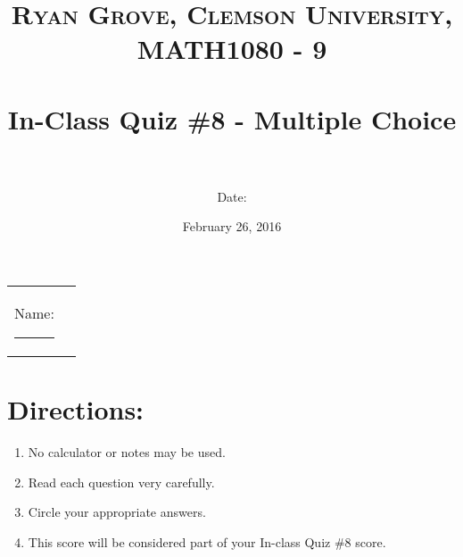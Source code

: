 \documentclass[paper=a4, fontsize=11pt]{scrartcl} %
\title{	
\normalfont \normalsize 
\textsc{Ryan Grove, Clemson University, MATH1080 - 9} \\ [25pt] %
\horrule{0.5pt} \\[0.4cm] %
\huge In-Class Quiz \#8 - Multiple Choice \\ %
\horrule{2pt} \\[0.5cm] %
}
\author{Date:} %
\date{\normalsize February 26, 2016} %
\numberwithin{equation}{section} %
\numberwithin{figure}{section} %
\numberwithin{table}{section} %
\begin{document}
\maketitle %

\begin{flushleft}
\begin{tabular}{l l}
Name: \rule{3.2in}{.01cm}  & {}%
\end{tabular}
\end{flushleft}


\section*{\textbf{Directions:}}
\begin{enumerate}
\item No calculator or notes may be used.
\item Read each question very carefully.
\item Circle your appropriate answers.
\item This score will be considered part of your In-class Quiz \#8 score.
\end{enumerate}
    \vspace{0.5in}
\newpage
\end{document}
